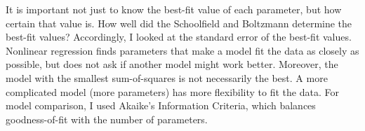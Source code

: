 \documentclass[11pt]{article}
\begin{document}


It is important not just to know the best-fit value of each parameter, but how certain that value is. How well did the Schoolfield and Boltzmann determine the best-fit values? Accordingly, I looked at the standard error of the best-fit values.
Nonlinear regression finds parameters that make a model fit the data as closely as possible, but does not ask if another model might work better.
Moreover, the model with the smallest sum-of-squares is not necessarily the best. A more complicated model (more parameters) has more flexibility to fit the data.
For model comparison, I used Akaike's Information Criteria, which balances goodness-of-fit with the number of parameters. %


\end{document}
